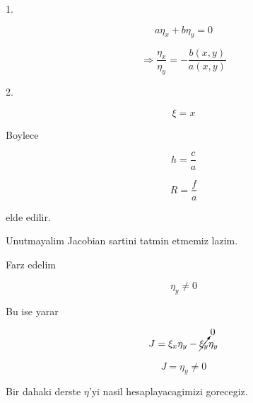 \documentclass[12pt,fleqn]{article}
\begin{document}
1.

\[ a \eta_x + b \eta_y = 0 \]

\[ \Rightarrow \frac{\eta_x}{\eta_y} = -\frac{b(x,y)}{a(x,y)}\]

2. 

\[ \xi = x \]

Boylece 

\[ h = \frac{c}{a} \]

\[ R = \frac{f}{a} \]

elde edilir. 

Unutmayalim Jacobian sartini tatmin etmemiz lazim. 

Farz edelim 

\[ \eta_y \ne 0 \]

Bu ise yarar

\[ J = \xi_x\eta_y - \cancelto{0}{\xi_y}\eta_y \]

\[ J = \eta_y \ne 0 \]

Bir dahaki derste $\eta$'yi nasil hesaplayacagimizi gorecegiz. 
\end{document}
